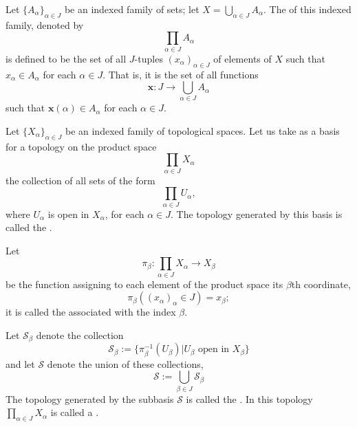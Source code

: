 \documentclass[12pt, a4paper, oneside, openright, titlepage]{book}
\begin{document}
\begin{defn}
    Let $\{A_{\alpha}\}_{\alpha \in J}$ be an indexed family of sets; let $X = \bigcup_{\alpha \in J}A_{\alpha}$. The  of this indexed family, denoted by \begin{equation*}
        \prod\limits_{\alpha\in J}A_{\alpha}
    \end{equation*}
    is defined to be the set of all $J$-tuples $(x_{\alpha})_{\alpha\in J}$ of elements of $X$ such that $x_{\alpha} \in A_{\alpha}$ for each $\alpha \in J$. That is, it is the set of all functions \begin{equation*}
        \mathbf{x}:J\rightarrow\bigcup\limits_{\alpha \in J}A_{\alpha}
    \end{equation*}
    such that $\mathbf{x}(\alpha) \in A_{\alpha}$ for each $\alpha \in J$.
\end{defn}


\begin{defn}
    Let $\{X_{\alpha}\}_{\alpha \in J}$ be an indexed family of topological spaces. Let us take as a basis for a topology on the product space \begin{equation*}
        \prod\limits_{\alpha \in J}X_{\alpha}
    \end{equation*}
    the collection of all sets of the form \begin{equation*}
        \prod\limits_{\alpha \in J}U_{\alpha},
    \end{equation*}
    where $U_{\alpha}$ is open in $X_{\alpha}$, for each $\alpha \in J$. The topology generated by this basis is called the .
\end{defn}


\begin{defn}
    Let \begin{equation*}
        \pi_{\beta}:\prod\limits_{\alpha \in J}X_{\alpha}\rightarrow X_{\beta}
    \end{equation*}
    be the function assigning to each element of the product space its $\beta$th coordinate, \begin{equation*}
        \pi_{\beta}((x_{\alpha})_{\alpha} \in J) = x_{\beta};
    \end{equation*}
    it is called the  associated with the index $\beta$.
\end{defn}


\begin{defn}
    Let $\mathcal{S}_{\beta}$ denote the collection \begin{equation*}
        \mathcal{S}_{\beta} := \{\pi_{\beta}^{-1}(U_{\beta}) \vert U_{\beta}\text{ open in } X_{\beta}\}
    \end{equation*}
    and let $\mathcal{S}$ denote the union of these collections,\begin{equation*}
        \mathcal{S} := \bigcup\limits_{\beta \in J}\mathcal{S}_{\beta}
    \end{equation*}
    The topology generated by the subbasis $\mathcal{S}$ is called the . In this topology $\prod_{\alpha \in J}X_{\alpha}$ is called a .
\end{defn}
\end{document}
